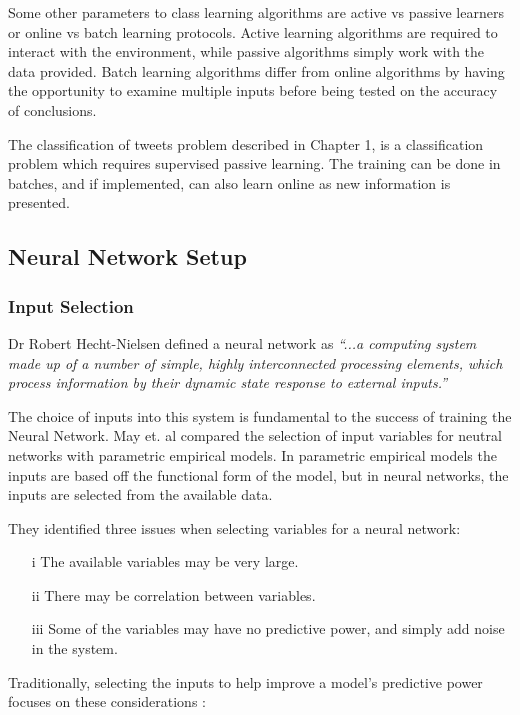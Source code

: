 Some other parameters to class learning algorithms are active vs passive learners or online vs batch learning protocols\cite{understand_ml}. Active learning algorithms are required to interact with the environment, while passive algorithms simply work with the data provided. Batch learning algorithms differ from online algorithms by having the opportunity to examine multiple inputs before being tested on the accuracy of conclusions.

The classification of tweets problem described in Chapter 1, is a classification problem which requires supervised passive learning. The training can be done in batches, and if implemented, can also learn online as new information is presented.

\subsection{Neural Network Setup}

\subsubsection{Input Selection}

Dr Robert Hecht-Nielsen\cite{Caudill_nn_primer} defined a neural network as \textit{``...a computing system made up of a number of simple, highly interconnected processing elements, which process information by their dynamic state response to external inputs.''}

The choice of inputs into this system is fundamental to the success of training the Neural Network. May et. al \cite{May_inputs} compared the selection of input variables for neutral networks with parametric empirical models. In parametric empirical models the inputs are based off the functional form of the model, but in neural networks, the inputs are selected from the available data.

They identified three issues when selecting variables for a neural network:
\begin{enumerate}
    \item[i] The available variables may be very large.
    \item[ii] There may be correlation between variables.
    \item[iii] Some of the variables may have no predictive power, and simply add noise in the system.
\end{enumerate}

Traditionally, selecting the inputs to help improve a model's predictive power focuses on these considerations \cite{Miller84variables}:

